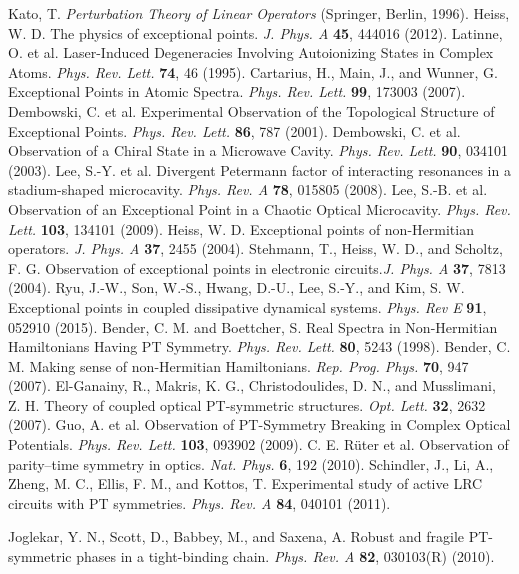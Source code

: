 \documentclass[report,epsfig,pre]{revtex4}
\begin{document}
\begin{thebibliography}{150}
 Kato, T. {\it Perturbation Theory of Linear Operators} (Springer, Berlin, 1996).
 Heiss, W. D. The physics of exceptional points. \textit{J. Phys. A} {\bf 45}, 444016 (2012).
 Latinne, O. et al. Laser-Induced Degeneracies Involving Autoionizing States in Complex Atoms. \textit{Phys. Rev. Lett.} {\bf 74}, 46 (1995).
 Cartarius, H., Main, J., and Wunner, G. Exceptional Points in Atomic Spectra. \textit{Phys. Rev. Lett.} {\bf 99},
173003 (2007).
 Dembowski, C. et al. Experimental Observation of the Topological Structure of Exceptional Points. \textit{Phys. Rev. Lett.} {\bf 86}, 787 (2001).
 Dembowski, C. et al. Observation of a Chiral State in a Microwave Cavity. \textit{Phys. Rev. Lett.} {\bf 90}, 034101 (2003).
 Lee, S.-Y. et al. Divergent Petermann factor of interacting resonances in a stadium-shaped microcavity. \textit{Phys. Rev. A} {\bf 78}, 015805 (2008).
 Lee, S.-B. et al. Observation of an Exceptional Point in a Chaotic Optical Microcavity. \textit{Phys. Rev. Lett.} {\bf 103}, 134101 (2009).
 Heiss, W. D. Exceptional points of non-Hermitian operators. \textit{J. Phys. A} {\bf 37}, 2455 (2004).
 Stehmann, T., Heiss, W. D., and Scholtz, F. G. Observation of exceptional points in electronic circuits.\textit{J. Phys. A} {\bf 37}, 7813 (2004).
 Ryu, J.-W., Son, W.-S., Hwang,  D.-U., Lee, S.-Y., and Kim, S. W. Exceptional points in coupled dissipative dynamical systems. \textit{Phys. Rev E} {\bf 91}, 052910 (2015).
 Bender, C. M. and Boettcher, S. Real Spectra in Non-Hermitian Hamiltonians Having PT Symmetry. \textit{Phys. Rev. Lett.} {\bf 80}, 5243 (1998).
 Bender, C. M. Making sense of non-Hermitian Hamiltonians. \textit{Rep. Prog. Phys.} {\bf 70}, 947 (2007).
 El-Ganainy, R., Makris, K. G., Christodoulides, D. N., and Musslimani, Z. H. Theory of coupled optical PT-symmetric structures. \textit{Opt. Lett.} {\bf 32}, 2632 (2007).
 Guo, A. et al. Observation of PT-Symmetry Breaking in Complex Optical Potentials. \textit{Phys. Rev. Lett.} {\bf 103}, 093902 (2009).
 C. E. R{\"u}ter et al. Observation of parity–time symmetry in optics. \textit{Nat. Phys.} {\bf 6}, 192 (2010).
 Schindler, J., Li, A., Zheng, M. C., Ellis, F. M., and Kottos, T. Experimental study of active LRC circuits with PT symmetries. \textit{Phys. Rev. A} {\bf 84}, 040101 (2011).

 Joglekar, Y. N., Scott, D., Babbey, M., and Saxena, A. Robust and fragile PT-symmetric phases in a tight-binding chain. \textit{Phys. Rev. A} {\bf 82}, 030103(R) (2010).


\end{thebibliography}
\end{document}
